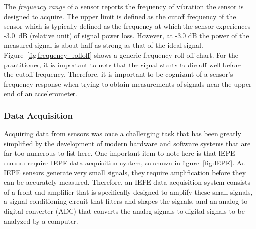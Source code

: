\documentclass[12pt,letter]{article}
\begin{document}



The \emph{frequency range} of a sensor reports the frequency of vibration the sensor is designed to acquire. The upper limit is defined as the cutoff frequency of the sensor which is typically defined as the frequency at which the sensor experiences -3.0~dB (relative unit) of signal power loss. However, at -3.0 dB the power of the measured signal is about half as strong as that of the ideal signal. Figure~\ref{fig:frequency_rolloff} shows a generic frequency roll-off chart. For the practitioner, it is important to note that the signal starts to die off well before the cutoff frequency. Therefore, it is important to be cognizant of a sensor's frequency response when trying to obtain measurements of signals near the upper end of an accelerometer. 





\subsubsection{Data Acquisition}

Acquiring data from sensors was once a challenging task that has been greatly simplified by the development of modern hardware and software systems that are far too numerous to list here. One important item to note here is that IEPE sensors require IEPE data acquisition system, as shown in figure~\ref{fig:IEPE}.  As IEPE sensors generate very small signals, they require amplification before they can be accurately measured. Therefore, an IEPE data acquisition system consists of a front-end amplifier that is specifically designed to amplify these small signals, a signal conditioning circuit that filters and shapes the signals, and an analog-to-digital converter (ADC) that converts the analog signals to digital signals to be analyzed by a computer.
\end{document}
